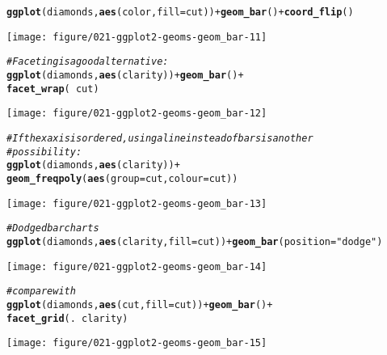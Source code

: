 \documentclass[a4paper,titlepage]{tufte-handout}\usepackage[]{graphicx}\usepackage[]{color}
\makeatletter
\def\maxwidth{ %
  \ifdim\Gin@nat@width>\linewidth
    \linewidth
  \else
    \Gin@nat@width
  \fi
}
\newcommand{\hlstr}[1]{\textcolor[rgb]{0.192,0.494,0.8}{#1}}%
\newcommand{\hlcom}[1]{\textcolor[rgb]{0.678,0.584,0.686}{\textit{#1}}}%
\newcommand{\hlopt}[1]{\textcolor[rgb]{0,0,0}{#1}}%
\newcommand{\hlstd}[1]{\textcolor[rgb]{0.345,0.345,0.345}{#1}}%
\newcommand{\hlkwc}[1]{\textcolor[rgb]{0.333,0.667,0.333}{#1}}%
\newcommand{\hlkwd}[1]{\textcolor[rgb]{0.737,0.353,0.396}{\textbf{#1}}}%
\newenvironment{kframe}{%
 \def\at@end@of@kframe{}%
 \ifinner\ifhmode%
  \def\at@end@of@kframe{\end{minipage}}%
  \begin{minipage}{\columnwidth}%
 \fi\fi%
 \def\FrameCommand##1{\hskip\@totalleftmargin \hskip-\fboxsep
 \colorbox{shadecolor}{##1}\hskip-\fboxsep
     \hskip-\linewidth \hskip-\@totalleftmargin \hskip\columnwidth}%
 \MakeFramed {\advance\hsize-\width
   \@totalleftmargin\z@ \linewidth\hsize
   \@setminipage}}%
 {\par\unskip\endMakeFramed%
 \at@end@of@kframe}
\newenvironment{knitrout}{}{} %
\makeatother
\begin{document}
\begin{knitrout}
\begin{kframe}\begin{alltt}
\hlkwd{ggplot}\hlstd{(diamonds,} \hlkwd{aes}\hlstd{(color,} \hlkwc{fill}\hlstd{=cut))} \hlopt{+} \hlkwd{geom_bar}\hlstd{()} \hlopt{+} \hlkwd{coord_flip}\hlstd{()}
\end{alltt}
\end{kframe}
\texttt{[image: figure/021-ggplot2-geoms-geom\_bar-11]} 
\begin{kframe}\begin{alltt}
\hlcom{# Faceting is a good alternative:}
\hlkwd{ggplot}\hlstd{(diamonds,} \hlkwd{aes}\hlstd{(clarity))} \hlopt{+} \hlkwd{geom_bar}\hlstd{()} \hlopt{+}
  \hlkwd{facet_wrap}\hlstd{(}\hlopt{~} \hlstd{cut)}
\end{alltt}
\end{kframe}
\texttt{[image: figure/021-ggplot2-geoms-geom\_bar-12]} 
\begin{kframe}\begin{alltt}
\hlcom{# If the x axis is ordered, using a line instead of bars is another}
\hlcom{# possibility:}
\hlkwd{ggplot}\hlstd{(diamonds,} \hlkwd{aes}\hlstd{(clarity))} \hlopt{+}
  \hlkwd{geom_freqpoly}\hlstd{(}\hlkwd{aes}\hlstd{(}\hlkwc{group} \hlstd{= cut,} \hlkwc{colour} \hlstd{= cut))}
\end{alltt}
\end{kframe}
\texttt{[image: figure/021-ggplot2-geoms-geom\_bar-13]} 
\begin{kframe}\begin{alltt}
\hlcom{# Dodged bar charts}
\hlkwd{ggplot}\hlstd{(diamonds,} \hlkwd{aes}\hlstd{(clarity,} \hlkwc{fill}\hlstd{=cut))} \hlopt{+} \hlkwd{geom_bar}\hlstd{(}\hlkwc{position}\hlstd{=}\hlstr{"dodge"}\hlstd{)}
\end{alltt}
\end{kframe}
\texttt{[image: figure/021-ggplot2-geoms-geom\_bar-14]} 
\begin{kframe}\begin{alltt}
\hlcom{# compare with}
\hlkwd{ggplot}\hlstd{(diamonds,} \hlkwd{aes}\hlstd{(cut,} \hlkwc{fill}\hlstd{=cut))} \hlopt{+} \hlkwd{geom_bar}\hlstd{()} \hlopt{+}
  \hlkwd{facet_grid}\hlstd{(.} \hlopt{~} \hlstd{clarity)}
\end{alltt}
\end{kframe}
\texttt{[image: figure/021-ggplot2-geoms-geom\_bar-15]} 
\begin{kframe}\begin{alltt}

\end{alltt}
\end{kframe}
\end{knitrout}
\end{document}
